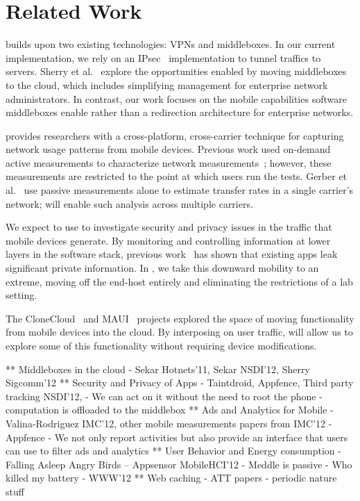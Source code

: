 \section{Related Work}
\meddle builds upon two existing technologies: VPNs and middleboxes. 
In our current implementation, we rely on an IPsec~\cite{rfc:ipsec} implementation 
to tunnel traffics to \meddle servers. Sherry et al.~\cite{sherry:middleboxes} explore the opportunities 
enabled by moving middleboxes to the cloud, which includes simplifying management 
for enterprise network administrators. In contrast, our work focuses on the mobile capabilities 
software middleboxes enable rather than a redirection architecture for enterprise networks. 

\meddle provides researchers with a cross-platform, cross-carrier technique 
for capturing network usage patterns from mobile devices. Previous work 
used on-demand active measurements to characterize network measurements~\cite{wang:middleboxes,speedtest}; 
however, these measurements are restricted to the point at which users run 
the tests. Gerber et al.~\cite{gerber:passivespeed} use passive measurements alone 
to estimate transfer rates in a single carrier's network; \meddle 
will enable such analysis across multiple carriers.

We expect to use \meddle to investigate security and privacy issues in the 
traffic that mobile devices generate. By monitoring and controlling 
information at lower layers in the software stack, previous work~\cite{enck:taintdroid,hornyack:appfence,wsj:apps-watching-you} has shown 
that existing apps leak significant private information. In \meddle, we take 
this downward mobility to an extreme, moving off the end-host entirely and 
eliminating the restrictions of a lab setting.

The CloneCloud~\cite{chun:clonecloud} and MAUI~\cite{cuervo:maui} projects explored the space of moving functionality 
from mobile devices into the cloud. By interposing on user traffic, \meddle will allow us to explore some of this 
functionality without requiring device modifications.


** Middleboxes in the cloud
 - Sekar Hotnets'11, Sekar NSDI'12, Sherry Sigcomm'12
** Security and Privacy of Apps
  - Taintdroid, Appfence, Third party tracking NSDI'12, 
  - We can act on it without the need to root the phone - computation is offloaded to the middlebox
** Ads and Analytics for Mobile
  - Valina-Rodriguez IMC'12, other mobile measurements papers from IMC'12
  - Appfence
  - We not only report activities but also provide an interface that users can use to filter ads and analytics
** User Behavior and Energy consumption
  - Falling Asleep Angry Birds -- Appsensor MobileHCI'12 
     - Meddle is passive
  - Who killed my battery - WWW'12 
** Web caching 
  - ATT papers - periodic nature stuff